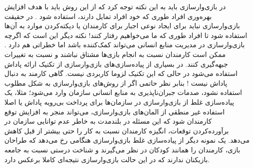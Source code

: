 در بازی‌وارسازی باید به این نکته توجه کرد که از این روش باید با هدف افزایش بهره‌وری افراد طوری که خود افراد تمایل دارند، استفاده شود \cite{tedx}. در حقیقت بازی‌وارسازی نباید برای ایجاد نوعی اجبار برای کارمندان یا دیکته‌کردن موارد به آن‌ها استفاده شود تا افراد طوری که ما می‌خواهیم رفتار کنند!
نکته دیگر این است که اگرچه بازی‌وارسازی در مدیریت منابع انسانی می‌تواند کمک‌کننده باشد اما خطراتی هم دارد \cite{atoz}. ممکن است کارمندان نسبت به انجام بازی‌ها مشتاق نباشند و نسبت به تغییرات جبهه‌گیری کنند. در بسیاری از پیاده‌سازی‌های بازی‌وارسازی از تکنیک ارائه پاداش استفاده می‌شود در حالی که این تکنیک لزوما کاربردی نیست. گاهی کارمند به دنبال پاداش نیست \cite{scenarios}! بنابر نظر حاتمی \cite{atoz} اگر از روش‌های بازی‌وارسازی به شکل مطلوب استفاده نشود، صدمات جبران‌ناپذیری به منابع انسانی سازمان وارد می‌شود؛ مثلا، یک پیاده‌سازی غلط از بازی‌وارسازی در سازمان‌ها برای پرداخت بی‌رویه پاداش یا اصلا استفاده غیر منطقی از المان‌های بازی‌وارسازی، می‌تواند منجر به افزایش توقع کارمندان شود که این مسئله در بلندمدت به خاطر عدم توانایی سازمان در برآورده‌کردن توقعات، انگیزه کارمندان نسبت به کار را حتی بیشتر از قبل کاهش می‌دهد. یک نمونه دیگر از پیاده‌سازی غلط بازی‌وارسازی هنگامی رخ می‌دهد که طراحان بازی، کارمندان را همانند کودکان در نظر می‌گیرند و شناخت درستی نسبت به جامعه بازیکنان ندارند که در این حالت بازی‌وارسازی نتیجه‌ای کاملا برعکس دارد.

